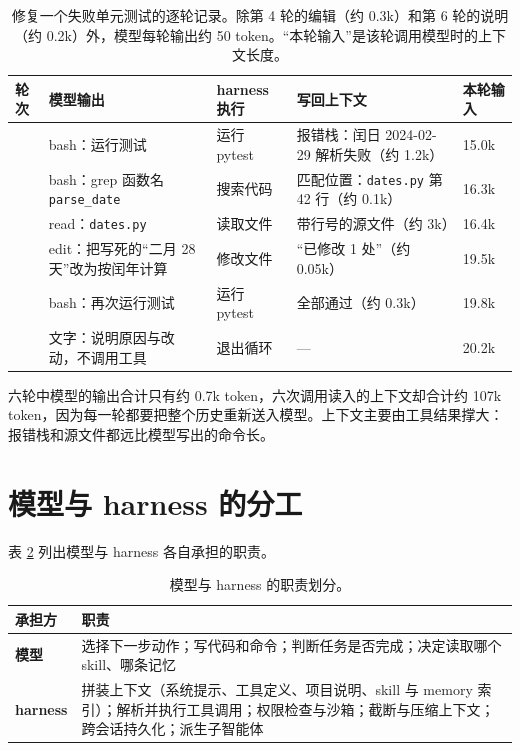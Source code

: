 \begin{table}[H]
\centering\small
\begin{tabularx}{\textwidth}{>{\centering\arraybackslash}p{9mm} >{\raggedright\arraybackslash}X >{\raggedright\arraybackslash}p{22mm} >{\raggedright\arraybackslash}X >{\raggedleft\arraybackslash}p{15mm}}
\toprule
轮次 & 模型输出 & harness 执行 & 写回上下文 & 本轮输入\\
\midrule
1 & bash：运行测试 & 运行 pytest & 报错栈：闰日 2024-02-29 解析失败（约 1.2k） & 15.0k\\
2 & bash：grep 函数名 \texttt{parse\_date} & 搜索代码 & 匹配位置：\texttt{dates.py} 第 42 行（约 0.1k） & 16.3k\\
3 & read：\texttt{dates.py} & 读取文件 & 带行号的源文件（约 3k） & 16.4k\\
4 & edit：把写死的“二月 28 天”改为按闰年计算 & 修改文件 & “已修改 1 处”（约 0.05k） & 19.5k\\
5 & bash：再次运行测试 & 运行 pytest & 全部通过（约 0.3k） & 19.8k\\
6 & 文字：说明原因与改动，不调用工具 & 退出循环 & — & 20.2k\\
\bottomrule
\end{tabularx}
\caption{修复一个失败单元测试的逐轮记录。除第 4 轮的编辑（约 0.3k）和第 6 轮的说明（约 0.2k）外，模型每轮输出约 50 token。“本轮输入”是该轮调用模型时的上下文长度。}
\label{tab:agent-trace}
\end{table}

六轮中模型的输出合计只有约 0.7k token，六次调用读入的上下文却合计约 107k token，因为每一轮都要把整个历史重新送入模型。上下文主要由工具结果撑大：报错栈和源文件都远比模型写出的命令长。

\section{模型与 harness 的分工}
\label{sec:agent-division}

表 \ref{tab:agent-roles} 列出模型与 harness 各自承担的职责。

\begin{table}[H]
\centering\small
\begin{tabularx}{\textwidth}{>{\bfseries}p{22mm} X}
\toprule
承担方 & 职责\\
\midrule
模型 & 选择下一步动作；写代码和命令；判断任务是否完成；决定读取哪个 skill、哪条记忆\\
harness & 拼装上下文（系统提示、工具定义、项目说明、skill 与 memory 索引）；解析并执行工具调用；权限检查与沙箱；截断与压缩上下文；跨会话持久化；派生子智能体\\
\bottomrule
\end{tabularx}
\caption{模型与 harness 的职责划分。}
\label{tab:agent-roles}
\end{table}

